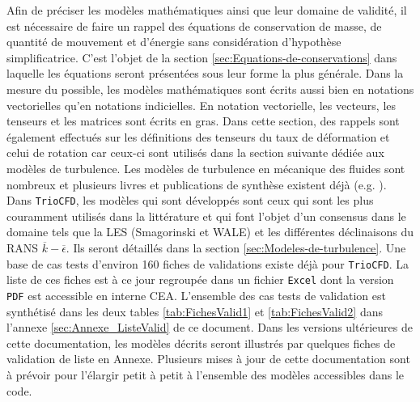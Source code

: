 Afin de pr\'eciser les mod\`eles math\'ematiques ainsi que leur domaine
de validit\'e, il est n\'ecessaire de faire un rappel des \'equations de
conservation de masse, de quantit\'e de mouvement et d'\'energie sans
consid\'eration d'hypoth\`ese simplificatrice. C'est l'objet de la section
\ref{sec:Equations-de-conservations} dans laquelle les \'equations
seront pr\'esent\'ees sous leur forme la plus g\'en\'erale. Dans la mesure
du possible, les mod\`eles math\'ematiques sont \'ecrits aussi bien en notations
vectorielles qu'en notations indicielles. En notation vectorielle,
les vecteurs, les tenseurs et les matrices sont \'ecrits en gras. Dans
cette section, des rappels sont \'egalement effectu\'es sur les d\'efinitions
des tenseurs du taux de d\'eformation et celui de rotation car ceux-ci
sont utilis\'es dans la section suivante d\'edi\'ee aux mod\`eles de turbulence.
Les mod\`eles de turbulence en m\'ecanique des fluides sont nombreux et
plusieurs livres et publications de synth\`ese existent d\'ej\`a (e.g. \cite{Book_Chassaing,Argyropoulos-Markatos_ReviewTurbulence_AMM2015}).
Dans \texttt{TrioCFD}, les mod\`eles qui sont d\'evelopp\'es sont ceux qui
sont les plus couramment utilis\'es dans la litt\'erature et qui font
l'objet d'un consensus dans le domaine tels que la LES (Smagorinski
et WALE) et les diff\'erentes d\'eclinaisons du RANS $\overline{k}-\overline{\epsilon}$.
Ils seront d\'etaill\'es dans la section \ref{sec:Modeles-de-turbulence}.
Une base de cas tests d'environ 160 fiches de validations existe d\'ej\`a
pour \texttt{TrioCFD}. La liste de ces fiches est \`a ce jour regroup\'ee
dans un fichier \texttt{Excel} dont la version \texttt{PDF} est accessible
en interne CEA. L'ensemble des cas tests de validation est synth\'etis\'e
dans les deux tables \ref{tab:FichesValid1} et \ref{tab:FichesValid2}
dans l'annexe \ref{sec:Annexe_ListeValid} de ce document. Dans les
versions ult\'erieures de cette documentation, les mod\`eles d\'ecrits seront
illustr\'es par quelques fiches de validation de liste en Annexe. Plusieurs
mises \`a jour de cette documentation sont \`a pr\'evoir pour l'\'elargir
petit \`a petit \`a l'ensemble des mod\`eles accessibles dans le code.
